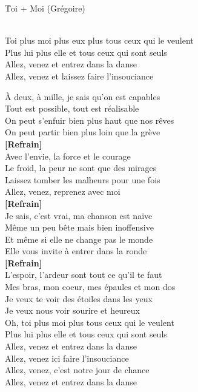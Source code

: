 \documentclass{novel}
\begin{document}
\newpage
\normalsize
\h*{Toi + Moi (Grégoire)}

\begin{bfseries}
[Refrain:]\\
Toi plus moi plus eux plus tous ceux qui le veulent \\
Plus lui plus elle et tous ceux qui sont seuls \\
Allez, venez et entrez dans la danse \\
Allez, venez et laissez faire l'insouciance \\
\end{bfseries}

À deux, à mille, je sais qu'on est capables \\
Tout est possible, tout est réalisable \\
On peut s'enfuir bien plus haut que nos rêves \\
On peut partir bien plus loin que la grève \\

\textbf{[Refrain]}\\

Avec l'envie, la force et le courage \\
Le froid, la peur ne sont que des mirages \\
Laissez tomber les malheurs pour une fois \\
Allez, venez, reprenez avec moi \\

\textbf{[Refrain]}\\

Je sais, c'est vrai, ma chanson est naïve \\
Même un peu bête mais bien inoffensive \\
Et même si elle ne change pas le monde \\
Elle vous invite à entrer dans la ronde \\

\textbf{[Refrain]}\\

L'espoir, l'ardeur sont tout ce qu'il te faut \\
Mes bras, mon coeur, mes épaules et mon dos \\
Je veux te voir des étoiles dans les yeux \\
Je veux nous voir sourire et heureux \\

Oh, toi plus moi plus tous ceux qui le veulent \\
Plus lui plus elle et tous ceux qui sont seuls \\
Allez, venez et entrez dans la danse \\
Allez, venez ici faire l'insouciance \\
Allez, venez, c'est notre jour de chance \\
Allez, venez et entrez dans la danse
\end{document}
